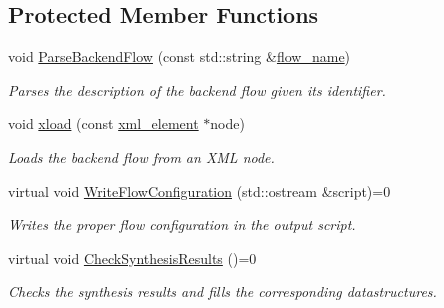 \subsection*{Protected Member Functions}
\begin{DoxyCompactItemize}
\item 
void \hyperlink{classBackendFlow_a83d8f5d29a20cf79338d224839af5912}{Parse\+Backend\+Flow} (const std\+::string \&\hyperlink{classBackendFlow_acb230ccab7e32cf0a88811097ff8c3f8}{flow\+\_\+name})
\begin{DoxyCompactList}\small\item\em Parses the description of the backend flow given its identifier. \end{DoxyCompactList}\item 
void \hyperlink{classBackendFlow_a4cda12a4fef49b04b549029e69ff4551}{xload} (const \hyperlink{classxml__element}{xml\+\_\+element} $\ast$node)
\begin{DoxyCompactList}\small\item\em Loads the backend flow from an X\+ML node. \end{DoxyCompactList}\item 
virtual void \hyperlink{classBackendFlow_acd93b1846b958eb6b7e10b9894bf5615}{Write\+Flow\+Configuration} (std\+::ostream \&script)=0
\begin{DoxyCompactList}\small\item\em Writes the proper flow configuration in the output script. \end{DoxyCompactList}\item 
virtual void \hyperlink{classBackendFlow_ad2096d43b7c9c47611d719188215f23f}{Check\+Synthesis\+Results} ()=0
\begin{DoxyCompactList}\small\item\em Checks the synthesis results and fills the corresponding datastructures. \end{DoxyCompactList}\end{DoxyCompactItemize}
